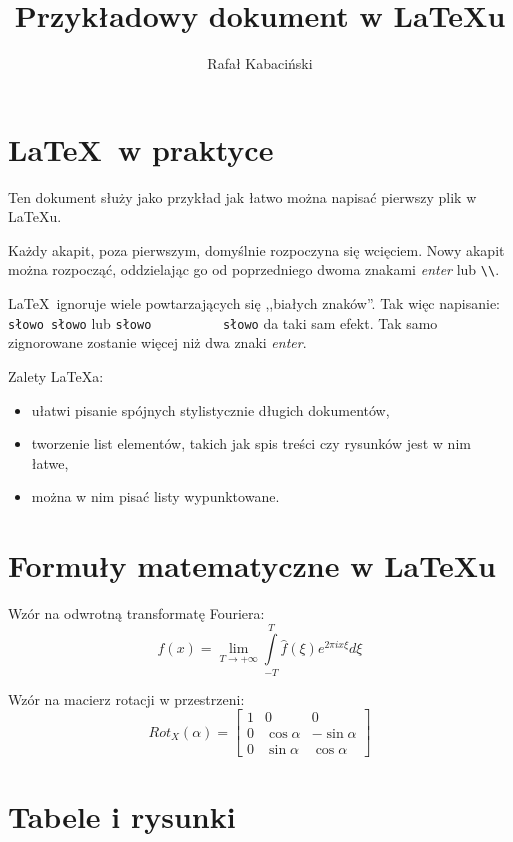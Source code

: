\documentclass[10pt,a4paper]{article}
\title{Przykładowy dokument w \LaTeX u}
\author{Rafał Kabaciński}
\begin{document}
	
	\maketitle
	
	\tableofcontents
	
	\section{\LaTeX\ w praktyce}
	Ten dokument służy jako przykład jak łatwo można napisać pierwszy plik w \LaTeX u. 
	
	Każdy akapit, poza pierwszym, domyślnie rozpoczyna się wcięciem.
	Nowy akapit można rozpocząć, oddzielając go od poprzedniego dwoma znakami \emph{enter} lub \verb|\\|.
	
	
	
	\LaTeX\ ignoruje        wiele powtarzających się ,,białych znaków''. Tak więc napisanie: \verb|słowo słowo| lub \verb|słowo          słowo| da taki sam efekt. Tak samo zignorowane zostanie więcej niż dwa znaki \emph{enter}.
	
	Zalety \LaTeX a:
	\begin{itemize}
		\item ułatwi pisanie spójnych stylistycznie długich dokumentów,
		\item tworzenie list elementów, takich jak spis treści czy rysunków jest w nim łatwe,
		\item można w nim pisać listy wypunktowane.
	\end{itemize}
	
	\section{Formuły matematyczne w \LaTeX u}
	
	Wzór na odwrotną transformatę Fouriera:
	\begin{equation}
		f(x) = \lim \limits_{T\rightarrow + \infty} \int \limits_{-T}^{T} \hat f (\xi) e^{2\pi i x \xi} d\xi
	\end{equation}
	
	Wzór na macierz rotacji w przestrzeni:
	$$
	Rot_X(\alpha) = \left[
	\begin{array}{ccc}
	1 & 0 & 0 \\
	0 & \cos \alpha & -\sin \alpha \\
	0 & \sin \alpha & \cos \alpha 
	\end{array}\right]
	$$
	
	\section{Tabele i rysunki}
	
\end{document}
